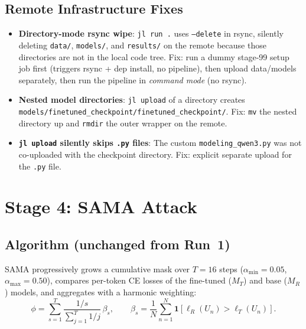 \documentclass[11pt,a4paper]{article}
\begin{document}
\subsection{Remote Infrastructure Fixes}

\begin{itemize}
  \item \textbf{Directory-mode rsync wipe}: \texttt{jl run .} uses
        \texttt{--delete} in rsync, silently deleting \texttt{data/},
        \texttt{models/}, and \texttt{results/} on the remote because those
        directories are not in the local code tree.  Fix: run a dummy stage-99
        setup job first (triggers rsync + dep install, no pipeline), then upload
        data/models separately, then run the pipeline in \emph{command mode} (no
        rsync).

  \item \textbf{Nested model directories}: \texttt{jl upload} of a directory
        creates \texttt{models/finetuned\_checkpoint/finetuned\_checkpoint/}.
        Fix: \texttt{mv} the nested directory up and \texttt{rmdir} the outer
        wrapper on the remote.

  \item \textbf{\texttt{jl upload} silently skips \texttt{.py} files}: The
        custom \texttt{modeling\_qwen3.py} was not co-uploaded with the
        checkpoint directory.  Fix: explicit separate upload for the \texttt{.py}
        file.
\end{itemize}

\section{Stage 4: SAMA Attack}

\subsection{Algorithm (unchanged from Run~1)}

SAMA progressively grows a cumulative mask over $T=16$ steps
($\alpha_{\min}=0.05$, $\alpha_{\max}=0.50$), compares per-token CE losses of
the fine-tuned ($M_T$) and base ($M_R$) models, and aggregates with a harmonic
weighting:
\[
  \phi = \sum_{s=1}^{T} \frac{1/s}{\sum_{j=1}^{T}1/j}\,\beta_s, \qquad
  \beta_s = \frac{1}{N}\sum_{n=1}^{N}
            \mathbf{1}\!\left[\ell_R(U_n) > \ell_T(U_n)\right].
\]
\end{document}
